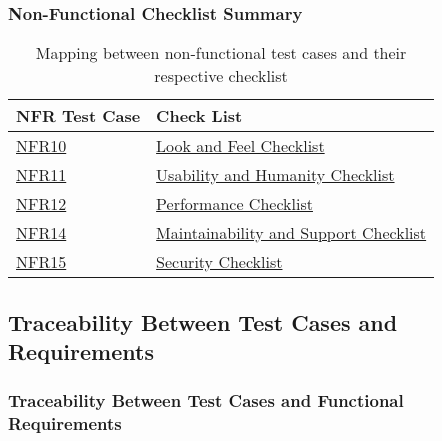 \documentclass[12pt, titlepage]{article}
\begin{document}
\subsubsection{Non-Functional Checklist Summary}

\begin{table}[h!]
\begin{tabularx}{\textwidth}{p{5cm}p{5cm}}
\toprule {\bf NFR Test Case} & {\bf Check List}\\
\midrule 

  \hyperlink{nfr10}{NFR10} & \hyperlink{checklist-nfr10}{Look and Feel Checklist}\\
  \hyperlink{nfr11}{NFR11} & \hyperlink{checklist-nfr11}{Usability and Humanity Checklist}\\
  \hyperlink{nfr12}{NFR12} & \hyperlink{checklist-nfr12}{Performance Checklist}\\
  \hyperlink{nfr14}{NFR14} & \hyperlink{checklist-nfr14}{Maintainability and Support Checklist}\\
  \hyperlink{nfr15}{NFR15} & \hyperlink{checklist-nfr15}{Security Checklist}\\

\bottomrule
\end{tabularx}
\caption{Mapping between non-functional test cases and their respective checklist}
\end{table}


\newpage
\subsection{Traceability Between Test Cases and Requirements}


\subsubsection{Traceability Between Test Cases and Functional Requirements}
\end{document}
